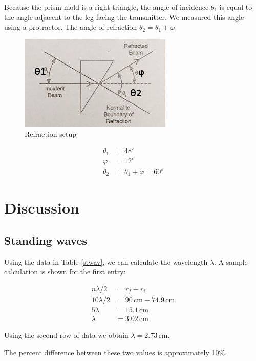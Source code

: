 \documentclass[11pt, titlepage, letterpaper, twoside]{article}
\begin{document}
Because the prism mold is a right triangle, the angle of incidence $\theta_1$ is equal to the angle adjacent to the leg facing
the transmitter. We measured this angle using a protractor. The angle of refraction $\theta_2 = \theta_1 + \varphi$.

\begin{figure}[h!]
  \centering
  \caption{Refraction setup}
  \includegraphics{refraction}
\end{figure}

\begin{align*}
  \theta_1 &= 48^\circ \\
  \varphi  &= 12^\circ \\
  \theta_2 &= \theta_1 + \varphi = 60^\circ
\end{align*}

\pagebreak

\section{Discussion}

\subsection{Standing waves}

Using the data in Table \ref{stwav}, we can calculate the wavelength $\lambda$. A sample calculation is shown for the first entry:

\begin{align*}
  n\lambda / 2  &= r_f - r_i \\
  10\lambda / 2 &= 90\,\mathrm{cm} - 74.9\,\mathrm{cm} \\
  5\lambda      &= 15.1\,\mathrm{cm} \\
  \lambda       &= 3.02\,\mathrm{cm}
\end{align*}

Using the second row of data we obtain $\lambda = 2.73\,\mathrm{cm}$.

The percent difference between these two values is approximately 10\%.
\end{document}
